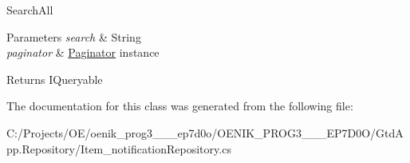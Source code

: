 Search\+All 


\begin{DoxyParams}{Parameters}
{\em search} & String\\
\hline
{\em paginator} & \mbox{\hyperlink{class_gtd_app_1_1_repository_1_1_paginator}{Paginator}} instance\\
\hline
\end{DoxyParams}
\begin{DoxyReturn}{Returns}
I\+Queryable
\end{DoxyReturn}


The documentation for this class was generated from the following file\+:\begin{DoxyCompactItemize}
\item 
C\+:/\+Projects/\+O\+E/oenik\+\_\+prog3\+\_\+\_\+\_\+ep7d0o/\+O\+E\+N\+I\+K\+\_\+\+P\+R\+O\+G3\+\_\+\_\+\_\+\+E\+P7\+D0\+O/\+Gtd\+App.\+Repository/Item\+\_\+notification\+Repository.\+cs\end{DoxyCompactItemize}
